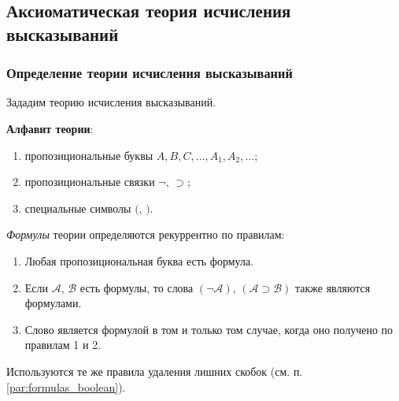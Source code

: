 \subsection{Аксиоматическая теория исчисления высказываний}
\subsubsection{Определение теории исчисления высказываний}
Зададим теорию исчисления высказываний.

\textbf{Алфавит теории}:
\begin{enumerate}
    \item пропозициональные буквы $A, B, C, \dots, A_1, A_2, \dots$;
    \item пропозициональные связки $\neg$, $\supset$;
    \item специальные символы $($, $)$.
\end{enumerate}
\textit{Формулы} теории определяются рекуррентно по правилам:
\begin{enumerate}
    \item Любая пропозициональная буква есть формула.
    \item Если $\mathcal{A}$, $\mathcal{B}$ есть формулы, то слова $(\neg\mathcal{A})$, $(\mathcal{A} \supset \mathcal{B})$ также являются формулами.
    \item Слово является формулой в том и только том случае, когда оно получено по правилам 1 и 2. 
\end{enumerate}
Используются те же правила удаления лишних скобок (см. п. \ref{par:formulas_boolean}).

